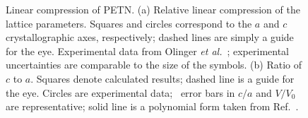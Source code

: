 \documentclass[prb,aps,nobibnotes,superbib,preprint]{revtex4}
\begin{document}
\begin{figure}
\caption{Linear compression of PETN.  (a) Relative linear compression
of the lattice parameters. Squares and circles correspond to the $a$
and $c$ crystallographic axes, respectively; dashed lines are simply a
guide for the eye.  Experimental data from Olinger {\it et
al.}~\cite{Olinger_1975v62}; experimental uncertainties are comparable
to the size of the symbols. (b) Ratio of $c$ to $a$.  Squares denote
calculated results; dashed line is a guide for the eye.  Circles are
experimental data;~\cite{Olinger_1975v62} error bars in $c/a$ and
$V/V_0$ are representative; solid line is a polynomial form taken from
Ref.~\cite{Olinger_1975v62}.  }
\label{fig:linear_compress}
\end{figure}
\end{document}
